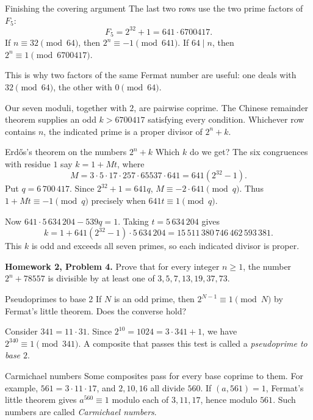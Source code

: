 \documentclass[aspectratio=169,11pt]{beamer}
\newcommand{\HW}[2]{{\color{teal}\textbf{Homework #1, Problem #2.}}}
\begin{document}
\begin{frame}{Finishing the covering argument}
The last two rows use the two prime factors of $F_5$:
\[F_5=2^{32}+1=641\cdot6700417.\]
If $n\equiv32\pmod{64}$, then $2^n\equiv-1\pmod{641}$. If $64\mid n$, then $2^n\equiv1\pmod{6700417}$.

This is why two factors of the same Fermat number are useful: one deals with $32\pmod{64}$, the other with $0\pmod{64}$.

Our seven moduli, together with $2$, are pairwise coprime. The Chinese remainder theorem supplies an odd $k>6700417$ satisfying every condition. Whichever row contains $n$, the indicated prime is a proper divisor of $2^n+k$.
\end{frame}
\begin{frame}{Erd\H{o}s's theorem on the numbers $2^n+k$}
\small
Which $k$ do we get? The six congruences with residue $1$ say $k=1+Mt$, where
\[M=3\cdot5\cdot17\cdot257\cdot65537\cdot641=641(2^{32}-1).\]
Put $q=6\,700\,417$. Since $2^{32}+1=641q$, $M\equiv-2\cdot641\pmod q$. Thus $1+Mt\equiv-1\pmod q$ precisely when $641t\equiv1\pmod q$.

Now $641\cdot5\,634\,204-539q=1$. Taking $t=5\,634\,204$ gives
\[k=1+641(2^{32}-1)\cdot5\,634\,204=15\,511\,380\,746\,462\,593\,381.\]
This $k$ is odd and exceeds all seven primes, so each indicated divisor is proper.

\HW{2}{4} Prove that for every integer $n\ge1$, the number $2^n+78557$ is divisible by at least one of $3,5,7,13,19,37,73$.
\end{frame}
\begin{frame}{Pseudoprimes to base 2}
If $N$ is an odd prime, then $2^{N-1}\equiv1\pmod N$ by Fermat's little theorem. Does the converse hold?

Consider $341=11\cdot31$. Since $2^{10}=1024=3\cdot341+1$, we have $2^{340}\equiv1\pmod{341}$. A composite that passes this test is called a \emph{pseudoprime to base $2$}.
\end{frame}
\begin{frame}{Carmichael numbers}
Some composites pass for every base coprime to them. For example, $561=3\cdot11\cdot17$, and $2,10,16$ all divide $560$. If $(a,561)=1$, Fermat's little theorem gives $a^{560}\equiv1$ modulo each of $3,11,17$, hence modulo $561$. Such numbers are called \emph{Carmichael numbers}.
\end{frame}


\end{document}
